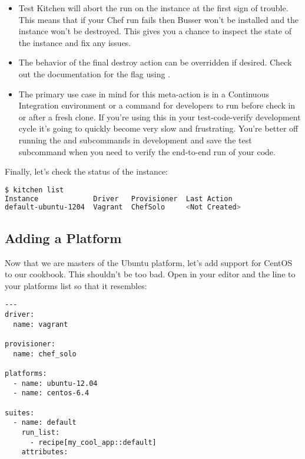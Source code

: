 \begin{itemize}
  \item Test Kitchen will abort the run on the instance at the first sign of trouble. This means that if your Chef run fails then Busser won't be installed and the instance won't be destroyed. This gives you a chance to inspect the state of the instance and fix any issues.
  \item The behavior of the final destroy action can be overridden if desired. Check out the documentation for the  flag using .
  \item The primary use case in mind for this meta-action is in a Continuous Integration environment or a command for developers to run before check in or after a fresh clone. If you're using this in your test-code-verify development cycle it's going to quickly become very slow and frustrating. You're better off running the  and  subcommands in development and save the test subcommand when you need to verify the end-to-end run of your code.
\end{itemize}

Finally, let's check the status of the instance:

\begin{lstlisting}[language=Bash,label=lst:testing-test-kitchen19]
$ kitchen list
Instance             Driver   Provisioner  Last Action
default-ubuntu-1204  Vagrant  ChefSolo     <Not Created>
\end{lstlisting}




\subsection{Adding a Platform}

Now that we are masters of the Ubuntu platform, let's add support for CentOS to our cookbook. This shouldn't be too bad. Open  in your editor and the  line to your platforms list so that it resembles:

\begin{lstlisting}[label=lst:testing-test-kitchen20]
---
driver:
  name: vagrant

provisioner:
  name: chef_solo

platforms:
  - name: ubuntu-12.04
  - name: centos-6.4

suites:
  - name: default
    run_list:
      - recipe[my_cool_app::default]
    attributes:
\end{lstlisting}

